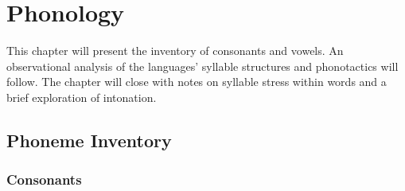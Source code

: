 \chapter{Phonology}
\label{cha:tvk-phonology}

This chapter will present the inventory of consonants and vowels. An observational analysis of the \langtvk{} languages' syllable structures and phonotactics will follow. The chapter will close with notes on syllable stress within words and a brief exploration of intonation.

\section{\langtvk{} Phoneme Inventory}
\label{sec:tvk-phone-inventory}

\subsection{Consonants}
\label{subsec:tvk-consonants}

